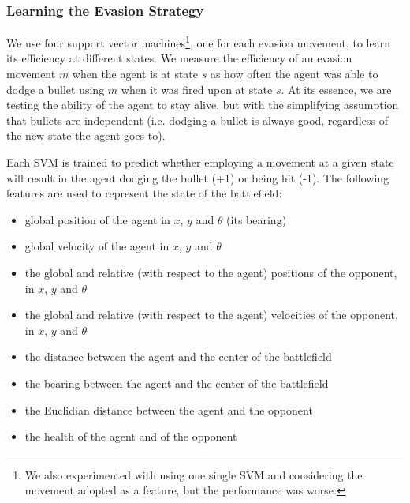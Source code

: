 \documentclass{article}
\theoremstyle{plain}
\theoremstyle{definition}
\theoremstyle{remark}
\begin{document}

\subsubsection*{Learning the Evasion Strategy}
We use four support vector machines\footnote{We also experimented with using one single SVM and considering the movement adopted as a feature, but the performance was worse.}, one for each evasion movement, to learn its efficiency at different states. We measure the efficiency
of an evasion movement $m$ when the agent is at state $s$ as how often the agent was able to dodge a bullet using $m$ when it was fired upon at state $s$. At its essence, we are testing the ability of the agent to stay alive, but with the simplifying assumption that bullets are independent (i.e. dodging a bullet is always good, regardless of the new state the agent goes to).

Each SVM is trained to predict whether employing a movement at a given state will result in the agent dodging the bullet (+1) or being hit
(-1). The following features are used to represent the state of the battlefield:

\begin{itemize}
	\item global position of the agent in $x$, $y$ and $\theta$ (its bearing)
	\item global velocity of the agent in $x$, $y$ and $\theta$
	\item the global and relative (with respect to the agent) positions of the opponent, in $x$, $y$ and $\theta$
	\item the global and relative (with respect to the agent) velocities of the opponent, in $x$, $y$ and $\theta$
	\item the distance between the agent and the center of the battlefield
	\item the bearing between the agent and the center of the battlefield
	\item the Euclidian distance between the agent and the opponent
	\item the health of the agent and of the opponent
\end{itemize}
\end{document}
